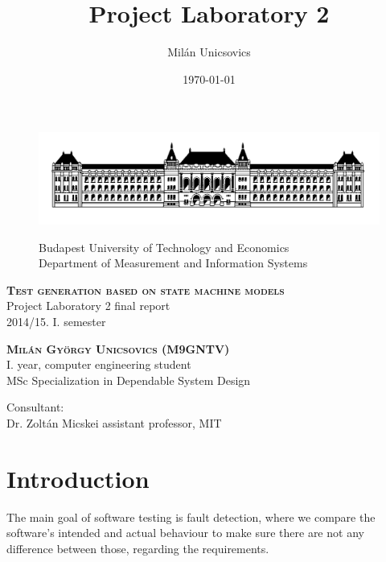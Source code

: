 \documentclass{article}
\author{Milán Unicsovics}
\title{Project Laboratory 2}
\date{\today}
\begin{document}
\begin{titlepage}

\begin{figure}[htp]
\centering
\includegraphics[scale=0.3]{img/bme.png}
\begin{center}
Budapest University of Technology and Economics\\
Department of Measurement and Information Systems
\end{center}
\end{figure}

\vspace{3cm}
\begin{center}
\textsc{\LARGE \textbf{Test generation based on state machine models}}
\vspace{0.5cm}\\
Project Laboratory 2 final report\\
2014/15. I. semester

\vspace{3cm}
\textsc{\large \textbf{Milán György Unicsovics (M9GNTV)}}
\vspace{0.5cm}\\
I. year, computer engineering student\\
MSc Specialization in Dependable System Design

\vspace*{\fill}

Consultant:\\
Dr. Zoltán Micskei assistant professor, MIT\\[0.3cm]

\end{center}

\end{titlepage}
%
\tableofcontents
\newpage

\section{Introduction}
\label{sec:intro}

The main goal of software testing is fault detection, where we compare the software's intended and actual behaviour to make sure there are not any difference between those, regarding the requirements.
\end{document}
